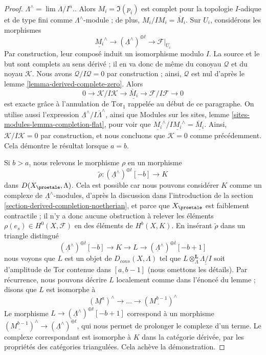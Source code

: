 \begin{proof}
{$\Lambda^\wedge = \lim \Lambda/I^n$.}.
Alors $M_i = \Im(p_i)$ est complet pour la topologie $I$-adique et de type fini
comme $\Lambda^\wedge$-module ; de plus, $M_i/IM_i = \overline{M}_i$.
Sur $U_i$, considérons les morphismes
$$
\underline{M_i}^\wedge \to
(\underline{\Lambda}^\wedge)^{\oplus t} \to
\mathcal{F}|_{U_i}
$$
Par construction, leur composé induit un isomorphisme modulo $I$.
La source et le but sont complets au sens dérivé ; il en va donc de même du conoyau
$\mathcal{Q}$ et du noyau $\mathcal{K}$. Nous avons
$\mathcal{Q}/I\mathcal{Q} = 0$ par construction ; ainsi, $\mathcal{Q}$
est nul d'après le lemme \ref{lemma-derived-complete-zero}.
Alors
$$
0 \to \mathcal{K}/I\mathcal{K} \to
\underline{\overline{M}_i}
\to \mathcal{F}/I\mathcal{F} \to 0
$$
est exacte grâce à l'annulation de $\text{Tor}_1$ rappelée au début de ce
paragraphe. On utilise aussi l'expression
$\underline{\Lambda}^\wedge/I\overline{\Lambda}^\wedge$,
ainsi que Modules sur les sites, lemme \ref{sites-modules-lemma-completion-flat},
pour voir que
$\underline{M_i}^\wedge/I\underline{M_i}^\wedge = \underline{\overline{M}_i}$.
Ainsi, $\mathcal{K}/I\mathcal{K} = 0$ par construction, et nous concluons
que $\mathcal{K} = 0$ comme précédemment. Cela démontre le résultat lorsque $a = b$.

\medskip\noindent
Si $b > a$, nous relevons le morphisme $\rho$ en un morphisme
$$
\tilde \rho : (\underline{\Lambda}^\wedge)^{\oplus t}[-b] \longrightarrow K
$$
dans $D(X_\proetale, \Lambda)$. Cela est possible car nous pouvons considérer
$K$ comme un complexe de $\underline{\Lambda}^\wedge$-modules, d'après la
discussion dans l'introduction de la
section \ref{section-derived-completion-noetherian},
et parce que $X_\proetale$ est faiblement contractile ;
il n'y a donc aucune obstruction à relever les éléments
$\rho(e_s) \in H^0(X, \mathcal{F})$ en des éléments de $H^b(X, K)$.
En insérant $\tilde \rho$ dans un triangle distingué
$$
(\underline{\Lambda}^\wedge)^{\oplus t}[-b] \to K \to L \to
(\underline{\Lambda}^\wedge)^{\oplus t}[-b + 1]
$$
nous voyons que $L$ est un objet de $D_{cons}(X, \Lambda)$ tel
que $L \otimes_\Lambda^\mathbf{L} \underline{\Lambda/I}$
soit d'amplitude de Tor contenue dans $[a, b - 1]$ (nous omettons les détails).
Par récurrence, nous pouvons décrire $L$ localement comme dans l'énoncé du lemme ; disons que
$L$ est isomorphe à
$$
(\underline{M^a})^\wedge \to \ldots \to (\underline{M^{b - 1}})^\wedge
$$
Le morphisme
$L \to (\underline{\Lambda}^\wedge)^{\oplus t}[-b + 1]$
correspond à un morphisme
$(\underline{M^{b - 1}})^\wedge \to (\underline{\Lambda}^\wedge)^{\oplus t}$,
qui nous permet de prolonger le complexe d'un terme. Le complexe correspondant
est isomorphe à $K$ dans la catégorie dérivée, par les propriétés
des catégories triangulées. Cela achève la démonstration.
\end{proof}

